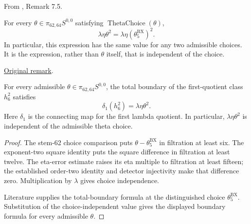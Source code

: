 \begin{remark}
\label{sem:Main:remark-7.5}
From \cite{LWX126}, Remark 7.5.\par
For every $\theta\in\pi_{62,64}S^{0,0}$ satisfying $\operatorname{ThetaChoice}(\theta)$,
\[
 \lambda\eta\theta^2=\lambda\eta(\theta_5^{\mathrm{BX}})^2.
\]
In particular, this expression has the same value for any two admissible choices. It is the expression, rather than $\theta$ itself, that is independent of the choice.

\href{paper/main.tex.html#L2133}{Original remark}.

For every admissible $\theta\in\pi_{62,64}S^{0,0}$, the total boundary of the first-quotient class $h_6^2$ satisfies
\[
 \delta_1(h_6^2)=\lambda\eta\theta^2.
\]
Here $\delta_1$ is the connecting map for the first lambda quotient. In particular, $\lambda\eta\theta^2$ is independent of the admissible theta choice.
\end{remark}
\begin{proof}
The stem-62 choice comparison puts $\theta-\theta_5^{\mathrm{BX}}$ in filtration at least six. The exponent-two square identity puts the square difference in filtration at least twelve. The eta-error estimate raises its eta multiple to filtration at least fifteen; the established order-two identity and detector injectivity make that difference zero. Multiplication by $\lambda$ gives choice independence.

Literature supplies the total-boundary formula at the distinguished choice $\theta_5^{\mathrm{BX}}$. Substitution of the choice-independent value gives the displayed boundary formula for every admissible $\theta$.
\end{proof}

